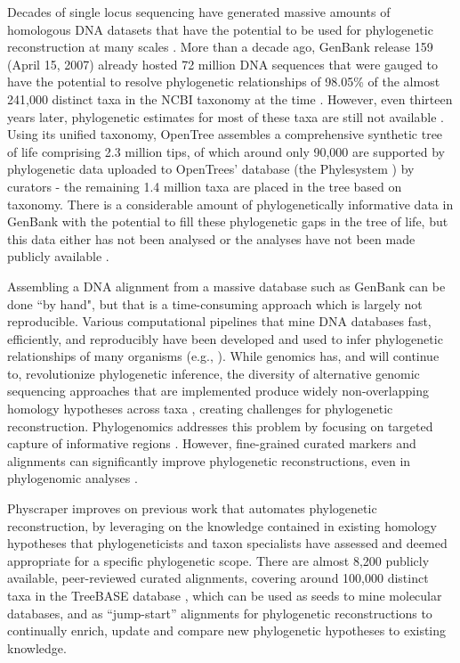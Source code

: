 \documentclass{bmcart}
\begin{document}
Decades of single locus sequencing have generated
massive amounts of homologous DNA datasets that have the potential to be used for phylogenetic
reconstruction at many scales \cite{sanderson2008phylota}.
More than a decade ago, GenBank release 159 (April 15, 2007) already hosted 72
million DNA sequences that were gauged to have the potential to resolve phylogenetic
relationships of 98.05\% of the almost 241,000
distinct taxa in the NCBI taxonomy at the time \cite{sanderson2008phylota}.
However, even thirteen years later, phylogenetic estimates for most of these taxa
are still not available \cite{mctavish_how_2017}.
Using its unified taxonomy, OpenTree assembles a comprehensive synthetic tree of life comprising
2.3 million tips, of which around only
90,000 are supported by phylogenetic data uploaded to OpenTrees' database (the Phylesystem
\cite{mctavish2015phylesystem}) by curators - the remaining 1.4 million taxa are placed
in the tree based on taxonomy.
There is a considerable amount of phylogenetically
informative data in GenBank with the potential to fill these phylogenetic gaps in
the tree of life, but this data either has not been analysed or the analyses
have not been made publicly available \cite{mctavish_how_2017}.

Assembling a DNA alignment from a massive database such as GenBank can be done ``by hand",
but that is a time-consuming approach which is largely not reproducible.
Various computational pipelines that mine DNA databases fast, efficiently, and reproducibly
have been developed and used to infer phylogenetic relationships of many organisms
(e.g., \cite{smith2009mega, antonelli2017toward, izquierdo2014pumper, pearse2013phylogenerator}).
While genomics has, and will continue to, revolutionize phylogenetic inference,
the diversity of alternative genomic sequencing approaches that are implemented produce
widely non-overlapping homology hypotheses across taxa \cite{jones2016targeted},
creating challenges for phylogenetic reconstruction.
Phylogenomics addresses this problem by focusing on targeted capture of informative
regions \cite{andermann2020guide}.
However, fine-grained curated markers and alignments can significantly improve phylogenetic
reconstructions, even in phylogenomic analyses \cite{fragoso2017pilot}.

Physcraper improves on previous work that automates phylogenetic reconstruction, by leveraging
on the knowledge contained in existing homology hypotheses that phylogeneticists and taxon specialists have assessed
and deemed appropriate for a specific phylogenetic scope.
There are almost 8,200 publicly available, peer-reviewed curated alignments, covering
around 100,000 distinct taxa in the TreeBASE database
\cite{piel2009treebase, vos2012nexml, piel2018treebasedmp},
which can be used as seeds to mine molecular databases, and as ``jump-start'' alignments
for phylogenetic reconstructions \cite{morrison2006multiple} to continually enrich,
update and compare new phylogenetic hypotheses to existing knowledge.
\end{document}
